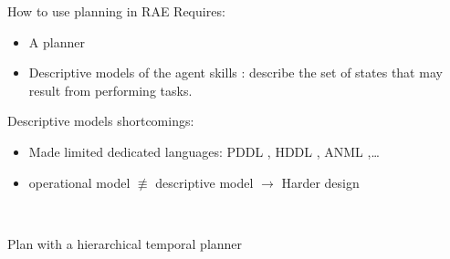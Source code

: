 \begin{frame}{How to use planning in RAE}
    Requires:
    \begin{itemize}
        \item A planner
        \item Descriptive models of the agent skills : describe the set of states that may result from performing tasks.
    \end{itemize} 
\pause
    Descriptive models shortcomings:
    \begin{itemize}
        \item Made limited dedicated languages: PDDL \cite{foxPDDL2ExtensionPDDL2003}, HDDL \cite{hollerHDDLExtensionPDDL2020}, ANML \cite{smith2008anml},\dots
        \item operational model $\not\equiv$ descriptive model $\rightarrow$ Harder design
    \end{itemize}

    ~
    \pause
    \centering

    \pause
    Plan with a hierarchical temporal planner

\end{frame}

